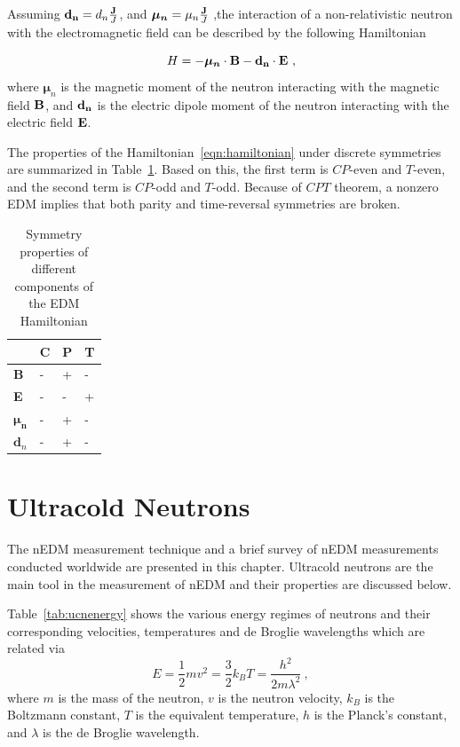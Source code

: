 Assuming ${\bf{d_n}} = d_n \frac{\bf{J}}{J}$, and
$\boldsymbol{\mu_n} = \mu_n \frac{\bf{J}}{J}$ ,the interaction of a
non-relativistic neutron with the electromagnetic field can be
described by the following Hamiltonian

\begin{equation}
  \label{eqn:hamiltonian}
 H= -\boldsymbol{\mu_n} \cdot \bf{B} - \bf{d}_n \cdot \bf{E}~,
 \end{equation}
where $\boldsymbol{\mu}_n$ is the magnetic moment of the neutron
interacting with the magnetic field $\bf{B}$, and $\bf{d}_n$ is
the electric dipole moment of the neutron interacting with the
electric field $\bf{E}$.

The properties of the Hamiltonian~\ref{eqn:hamiltonian} under discrete
symmetries are summarized in Table~\ref{tab:Hsymmetry}. Based on this,
the first term is $CP$-even and $T$-even, and the second term is
$CP$-odd and $T$-odd. Because of $CPT$ theorem, a nonzero EDM implies
that both parity and time-reversal symmetries are broken.


\begin{table}[h!]
\begin{center}
\begin{tabular}{| l | l | l | l |} 
\hline
 & C & P & T \\ \hline
\textbf{B} & - &+ &- \\ \hline
\textbf{E} & -&- &+ \\ \hline
$\boldsymbol{\mu_n}$ &- &+ &- \\ \hline 
$\textbf{d}_n$ & -&+ &- \\ \hline
\end{tabular}
\caption{Symmetry properties of different components of the EDM
  Hamiltonian  \label{tab:Hsymmetry}}
\end{center}
\end{table}
  

\section{Ultracold Neutrons\label{sec:ucnproperties}}

The nEDM measurement technique and a brief survey of nEDM measurements
conducted worldwide are presented in this chapter. Ultracold neutrons
are the main tool in the measurement of nEDM and their properties are
discussed below.

Table~\ref{tab:ucnenergy} shows the various energy regimes of neutrons
and their corresponding velocities, temperatures and de Broglie
wavelengths which are related via
\begin{equation}
  \label{eqn:ucnenergy}
  E = \frac{1}{2} m v^2 = \frac{3}{2} k_B T = \frac{h^2}{2m \lambda^2}~,
\end{equation}
where $m$ is the mass of the neutron, $v$ is the neutron velocity,
$k_B$ is the Boltzmann constant, $T$ is the equivalent temperature,
$h$ is the Planck's constant, and $\lambda$ is the de Broglie
wavelength.

